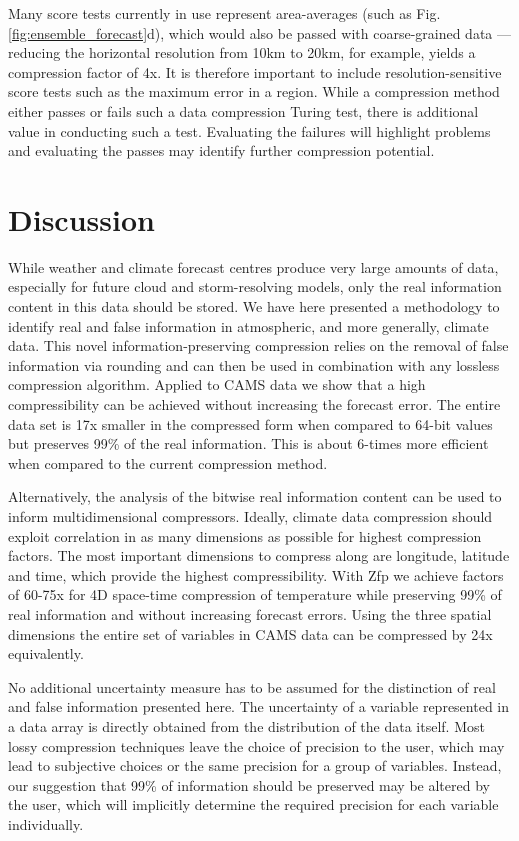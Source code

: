 Many score tests currently in use represent area-averages (such as Fig. \ref{fig:ensemble_forecast}d), which would also be passed with
coarse-grained data — reducing the horizontal resolution from 10km to 20km, for example, yields a compression factor of 4x. It is therefore
important to include resolution-sensitive score tests such as the maximum error in a region. While a compression method either passes or
fails such a data compression Turing test, there is additional value in conducting such a test. Evaluating the failures will highlight problems
and evaluating the passes may identify further compression potential.

\section{Discussion}
\label{sec:compression_discussion}

While weather and climate forecast centres produce very large amounts of data, especially for future cloud and storm-resolving models,
only the real information content in this data should be stored. We have here presented a methodology to identify real and false information
in atmospheric, and more generally, climate data. This novel information-preserving compression relies on the removal of false information
via rounding and can then be used in combination with any lossless compression algorithm. Applied to CAMS data we show that a high
compressibility can be achieved without increasing the forecast error. The entire data set is 17x smaller in the compressed form when
compared to 64-bit values but preserves 99\% of the real information. This is about 6-times more efficient when compared to the
current compression method.

Alternatively, the analysis of the bitwise real information content can be used to inform multidimensional compressors. Ideally, climate data
compression should exploit correlation in as many dimensions as possible for highest compression factors. The most important dimensions
to compress along are longitude, latitude and time, which provide the highest compressibility. With Zfp we achieve factors of 60-75x for
4D space-time compression of temperature while preserving 99\% of real information and without increasing forecast errors. Using the three
spatial dimensions the entire set of variables in CAMS data can be compressed by 24x equivalently.

No additional uncertainty measure has to be assumed for the distinction of real and false information presented here. The uncertainty of a variable
represented in a data array is directly obtained from the distribution of the data itself. Most lossy compression techniques leave the choice of
precision to the user, which may lead to subjective choices or the same precision for a group of variables. Instead, our suggestion that
99\% of information should be preserved may be altered by the user, which will implicitly determine the required precision for each variable individually. 

